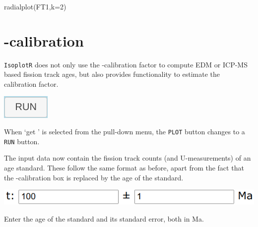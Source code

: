 \begin{refsection}
\begin{console}
radialplot(FT1,k=2)
\end{console}

\section{\textzeta-calibration}

\texttt{IsoplotR} does not only use the \textzeta-calibration factor
to compute EDM or ICP-MS based fission track ages, but also provides
functionality to estimate the calibration factor.\\

\noindent\begin{minipage}[t]{.1\linewidth}
\strut\vspace*{-\baselineskip}\newline
\includegraphics[width=\linewidth]{../figures/RUN.png}
\end{minipage}
\begin{minipage}[t]{.9\linewidth}
  When `get \textzeta' is selected from the pull-down menu, the
  \texttt{PLOT} button changes to a \texttt{RUN} button.\\
\end{minipage}

The input data now contain the fission track counts (and
U-measurements) of an age standard. These follow the same format as
before, apart from the fact that the \textzeta-calibration box is
replaced by the age of the standard.\\

\noindent\begin{minipage}[t]{.5\linewidth}
\strut\vspace*{-\baselineskip}\newline
\includegraphics[width=\linewidth]{../figures/FTzetaT.png}
\end{minipage}
\begin{minipage}[t]{.5\linewidth}
Enter the age of the standard and its standard error, both in Ma.\\
\end{minipage}


\end{refsection}
